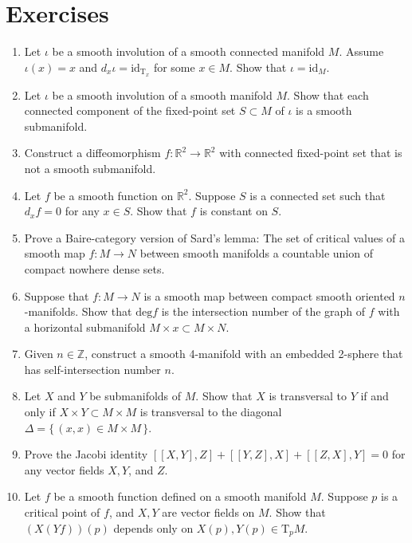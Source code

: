 \chapter{Exercises}

\begin{enumerate}
\item
Let \(\iota\) be a smooth involution of a smooth connected manifold \(M\).
Assume \(\iota(x)=x\) and \(d_x\iota=\mathrm{id}_{\mathrm{T}_x}\) for some \(x\in M\).
Show that \(\iota=\mathrm{id}_M\).

\item
 Let \(\iota\) be a smooth involution of a smooth manifold \(M\).
Show that each connected component of the fixed-point set \(S\subset M\) of \(\iota\) is a smooth submanifold.

\item
Construct a diffeomorphism \(f\colon \mathbb{R}^2\to \mathbb{R}^2\) with connected fixed-point set that is not a smooth submanifold.

\item
Let \(f\) be a smooth function on \(\mathbb{R}^2\).
Suppose \(S\) is a connected set such that \(d_xf=0\) for any \(x\in S\).
Show that \(f\) is constant on \(S\).

\item
Prove a Baire-category version of Sard's lemma:
The set of critical values of a smooth map \(f\colon M\to N\) between smooth manifolds a countable union of compact nowhere dense sets.

\item Suppose that \(f\colon M\to N\) is a smooth map between compact smooth oriented \(n\)-manifolds.
Show that \(\mathrm{deg}f\) is the intersection number of the graph of \(f\) with a horizontal submanifold \(M\times x\subset M\times N\).

\item Given \(n\in\mathbb{Z}\), construct a smooth 4-manifold with an embedded 2-sphere that has self-intersection number \(n\).

\item Let \(X\) and \(Y\) be submanifolds of \(M\).
Show that \(X\) is transversal to \(Y\) if and only if \(X\times Y\subset M\times M\) is transversal to the diagonal \(\Delta=\{\,(x,x)\in M\times M\,\}\).

\item Prove the Jacobi identity \([[X,Y],Z]+[[Y,Z],X]+[[Z,X],Y]=0\) for any vector fields \(X,Y\), and \(Z\).

\item Let \(f\) be a smooth function defined on a smooth manifold \(M\).
Suppose \(p\) is a critical point of \(f\), and \(X,Y\) are vector fields on \(M\).
Show that \((X(Yf))(p)\) depends only on \(X(p),Y(p)\in\mathrm{T}_pM\).


\end{enumerate}
